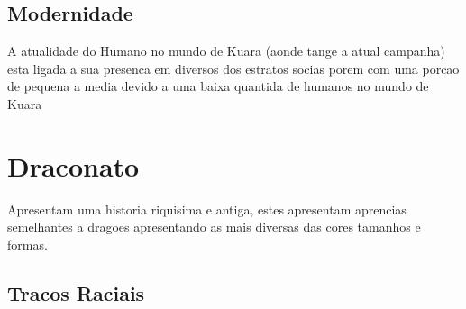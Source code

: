 \documentclass{book}
\begin{document}
\section{Modernidade}
A atualidade do Humano no mundo de Kuara (aonde tange a atual campanha) esta ligada a sua 
presenca em diversos dos estratos socias porem com uma porcao de pequena a media devido a 
uma baixa quantida de humanos no mundo de Kuara 

\chapter{Draconato}
Apresentam uma historia riquisima e antiga, estes apresentam aprencias semelhantes a dragoes 
apresentando as mais diversas das cores tamanhos e formas. 
\section{Tracos Raciais}
\end{document}
